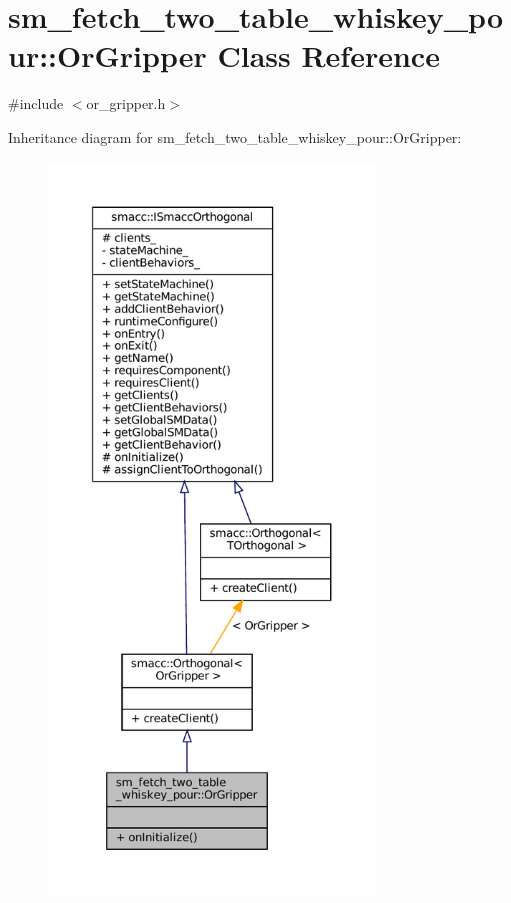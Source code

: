 \hypertarget{classsm__fetch__two__table__whiskey__pour_1_1OrGripper}{}\section{sm\+\_\+fetch\+\_\+two\+\_\+table\+\_\+whiskey\+\_\+pour\+:\+:Or\+Gripper Class Reference}
\label{classsm__fetch__two__table__whiskey__pour_1_1OrGripper}


{\ttfamily \#include $<$or\+\_\+gripper.\+h$>$}



Inheritance diagram for sm\+\_\+fetch\+\_\+two\+\_\+table\+\_\+whiskey\+\_\+pour\+:\+:Or\+Gripper\+:
\nopagebreak
\begin{figure}[H]
\begin{center}
\leavevmode
\includegraphics[height=550pt]{classsm__fetch__two__table__whiskey__pour_1_1OrGripper__inherit__graph}
\end{center}
\end{figure}


